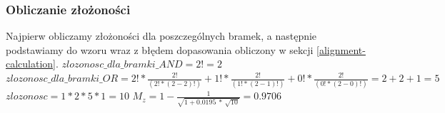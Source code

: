 \subsubsection{Obliczanie złożoności}
Najpierw obliczamy złożoności dla poszczególnych bramek, a następnie podstawiamy do wzoru wraz z błędem dopasowania obliczony w sekcji \ref{alignment-calculation}.\newline
$zlozonosc\_dla\_bramki\_AND = 2! = 2$\newline
$zlozonosc\_dla\_bramki\_OR = 2! * \frac{2!}{(2! * (2 - 2)!)} + 1! *  \frac{2!}{(1! * (2 - 1)!)} + 0! * \frac{2!}{(0! * (2 - 0)!)} = 2 + 2 + 1 = 5$\newline
$zlozonosc = 1 * 2 * 5 * 1 = 10$\newline
$M_z = 1 - \frac{1}{\sqrt{1 + 0.0195\ *\ \sqrt{10}}} = 0.9706$